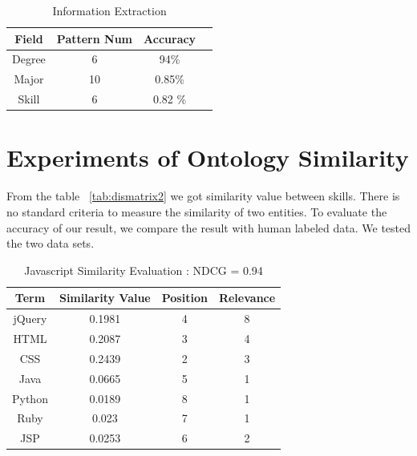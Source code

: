 \begin{table}[ht]
\caption{Information Extraction} %
\centering %
\begin{tabular}{   | c | c | c | c |   }
 \hline
                     Field   & Pattern Num & Accuracy     \\
 \hline
                     Degree & 6         & 94\%         \\
 \hline
                     Major  & 10        & 0.85\%      \\
 \hline
                     Skill  & 6         & 0.82 \%      \\
 \hline
\end{tabular}
\label{tab:ieaccura} %
\end{table}

\section{Experiments of Ontology Similarity}

From the table ~\ref{tab:dismatrix2} we got similarity value between skills. There is no standard criteria to measure the similarity of two entities.  To evaluate the accuracy of our result, we compare the result with human labeled data. We tested the two data sets. 

  
 
\begin{table}
\centering
\caption{ Javascript Similarity Evaluation : NDCG = 0.94 }
\begin{tabular}{ | c | c | c  | c |  }
 \hline
    Term     &  Similarity Value  &  Position   & Relevance     \\  \hline  
    jQuery   &  0.1981            &      4      &   8        \\
     HTML    &  0.2087            &      3      &   4         \\
     CSS     &  0.2439            &      2      &   3   \\
     Java    &  0.0665            &      5      &   1   \\
    Python   &  0.0189            &      8      &   1   \\
     Ruby    &  0.023             &      7      &   1    \\
     JSP     &  0.0253            &      6      &   2    \\
 \hline
\end{tabular}
\label{tab:simcompare1}
\end{table}


